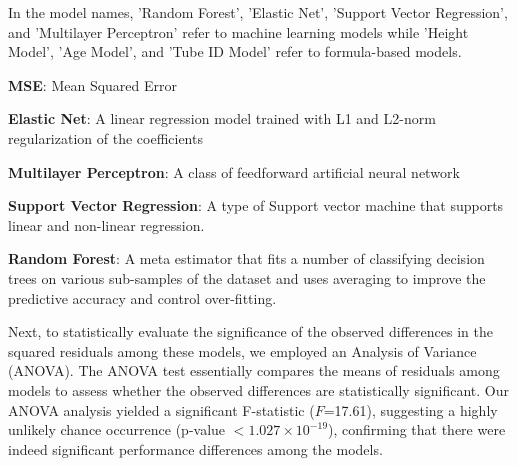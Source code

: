 \documentclass[11pt]{article}
\begin{document}
\begin{table}[h]
\caption{Comparison of Mean Squared Error (MSE) between ML models and formula-based models}
\label{table:comparison_mse}
\begin{threeparttable}
\renewcommand{\TPTminimum}{\linewidth}
\begin{tablenotes}
\footnotesize
\item In the model names, 'Random Forest', 'Elastic Net', 'Support Vector Regression', and 'Multilayer Perceptron' refer to machine learning models while 'Height Model', 'Age Model', and 'Tube ID Model' refer to formula-based models.
\item \textbf{MSE}: Mean Squared Error
\item \textbf{Elastic Net}: A linear regression model trained with L1 and L2-norm regularization of the coefficients
\item \textbf{Multilayer Perceptron}: A class of feedforward artificial neural network
\item \textbf{Support Vector Regression}: A type of Support vector machine that supports linear and non-linear regression.
\item \textbf{Random Forest}: A meta estimator that fits a number of classifying decision trees on various sub-samples of the dataset and uses averaging to improve the predictive accuracy and control over-fitting.
\end{tablenotes}
\end{threeparttable}
\end{table}


Next, to statistically evaluate the significance of the observed differences in the squared residuals among these models, we employed an Analysis of Variance (ANOVA). The ANOVA test essentially compares the means of residuals among models to assess whether the observed differences are statistically significant. Our ANOVA analysis yielded a significant F-statistic ($F$=17.61), suggesting a highly unlikely chance occurrence (p-value $<1.027 \times 10^{-19}$), confirming that there were indeed significant performance differences among the models.
\end{document}

